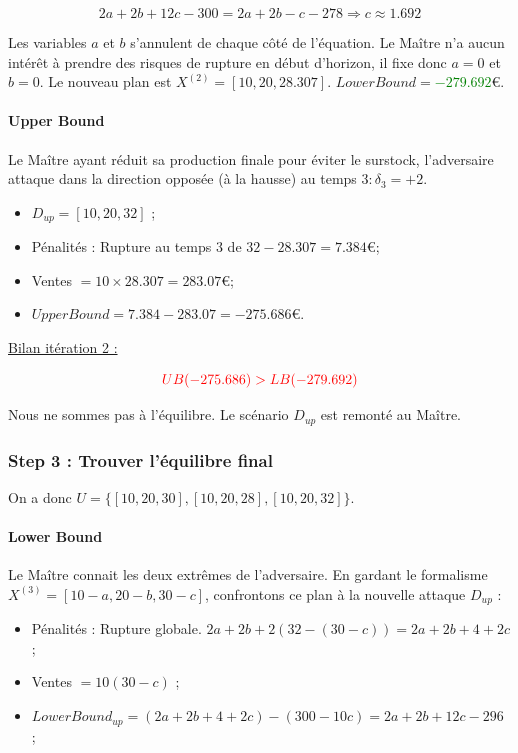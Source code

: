 \[
    2a+2b+12c-300=2a+2b-c-278 \Longrightarrow c \approx 1.692
\]

Les variables $a$ et $b$ s'annulent de chaque côté de l'équation. Le Maître n'a aucun intérêt à prendre des risques de rupture en début d'horizon, il fixe donc $a=0$ et $b=0$. Le nouveau plan est $X^{(2)}=[10, 20, 28.307]$. $LowerBound=$\textcolor{green}{$-279.692$}\euro.

\paragraph{Upper Bound} Le Maître ayant réduit sa production finale pour éviter le surstock, l'adversaire attaque dans la direction opposée (à la hausse) au temps $3 : \delta_3=+2$.

\begin{itemize}
    \item $D_{up}=[10, 20, 32]$ ;
    \item Pénalités : Rupture au temps $3$ de $32-28.307=7.384$\euro ;
    \item Ventes $=10\times28.307=283.07$\euro ;
    \item $UpperBound=7.384-283.07=-275.686$\euro.
\end{itemize}

\underline{Bilan itération 2 :}

\[
    \textcolor{red}{UB(-275.686) > LB(-279.692)}
\]

Nous ne sommes pas à l'équilibre. Le scénario $D_{up}$ est remonté au Maître.

\subsubsection{Step 3 : Trouver l'équilibre final}

On a donc $U=\{[10, 20, 30], [10, 20, 28], [10, 20, 32]\}$.

\paragraph{Lower Bound} Le Maître connait les deux extrêmes de l'adversaire. En gardant le formalisme $X^{(3)}=[10-a, 20-b, 30-c]$, confrontons ce plan à la nouvelle attaque $D_{up}$ :

\begin{itemize}
    \item Pénalités : Rupture globale. $2a+2b+2(32-(30-c))=2a+2b+4+2c$ ;
    \item Ventes $=10(30-c)$ ;
    \item $LowerBound_{up}=(2a+2b+4+2c)-(300-10c)=2a+2b+12c-296$ ;
\end{itemize}

